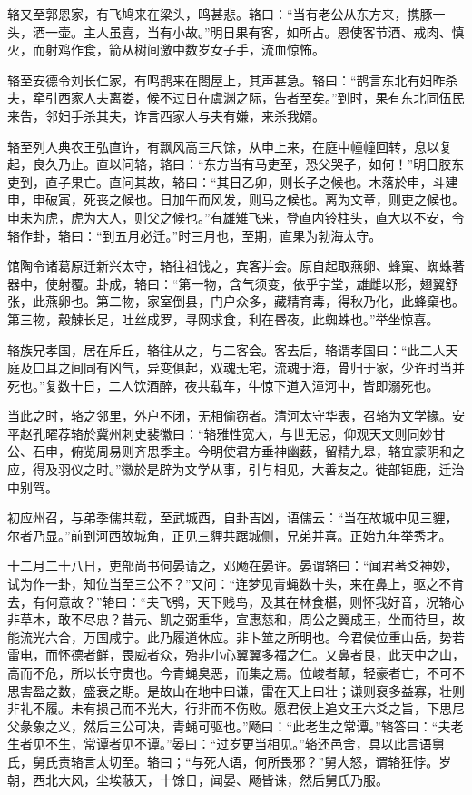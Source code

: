 \documentclass[12pt,UTF8]{ctexbook}
\begin{document}
辂又至郭恩家，有飞鸠来在梁头，鸣甚悲。辂曰：“当有老公从东方来，携豚一头，酒一壶。主人虽喜，当有小故。”明日果有客，如所占。恩使客节酒、戒肉、慎火，而射鸡作食，箭从树间激中数岁女子手，流血惊怖。

辂至安德令刘长仁家，有鸣鹊来在閤屋上，其声甚急。辂曰：“鹊言东北有妇昨杀夫，牵引西家人夫离娄，候不过日在虞渊之际，告者至矣。”到时，果有东北同伍民来告，邻妇手杀其夫，诈言西家人与夫有嫌，来杀我婿。

辂至列人典农王弘直许，有飘风高三尺馀，从申上来，在庭中幢幢回转，息以复起，良久乃止。直以问辂，辂曰：“东方当有马吏至，恐父哭子，如何！”明日胶东吏到，直子果亡。直问其故，辂曰：“其日乙卯，则长子之候也。木落於申，斗建申，申破寅，死丧之候也。日加午而风发，则马之候也。离为文章，则吏之候也。申未为虎，虎为大人，则父之候也。”有雄雉飞来，登直内铃柱头，直大以不安，令辂作卦，辂曰：“到五月必迁。”时三月也，至期，直果为勃海太守。

馆陶令诸葛原迁新兴太守，辂往祖饯之，宾客并会。原自起取燕卵、蜂窠、蜘蛛著器中，使射覆。卦成，辂曰：“第一物，含气须变，依乎宇堂，雄雌以形，翅翼舒张，此燕卵也。第二物，家室倒县，门户众多，藏精育毒，得秋乃化，此蜂窠也。第三物，觳觫长足，吐丝成罗，寻网求食，利在昬夜，此蜘蛛也。”举坐惊喜。

辂族兄孝国，居在斥丘，辂往从之，与二客会。客去后，辂谓孝国曰：“此二人天庭及口耳之间同有凶气，异变俱起，双魂无宅，流魂于海，骨归于家，少许时当并死也。”复数十日，二人饮酒醉，夜共载车，牛惊下道入漳河中，皆即溺死也。

当此之时，辂之邻里，外户不闭，无相偷窃者。清河太守华表，召辂为文学掾。安平赵孔曜荐辂於冀州刺史裴徽曰：“辂雅性宽大，与世无忌，仰观天文则同妙甘公、石申，俯览周易则齐思季主。今明使君方垂神幽薮，留精九皋，辂宜蒙阴和之应，得及羽仪之时。”徽於是辟为文学从事，引与相见，大善友之。徙部钜鹿，迁治中别驾。

初应州召，与弟季儒共载，至武城西，自卦吉凶，语儒云：“当在故城中见三貍，尔者乃显。”前到河西故城角，正见三貍共踞城侧，兄弟并喜。正始九年举秀才。

十二月二十八日，吏部尚书何晏请之，邓飏在晏许。晏谓辂曰：“闻君著爻神妙，试为作一卦，知位当至三公不？”又问：“连梦见青蝇数十头，来在鼻上，驱之不肯去，有何意故？”辂曰：“夫飞鸮，天下贱鸟，及其在林食椹，则怀我好音，况辂心非草木，敢不尽忠？昔元、凯之弼重华，宣惠慈和，周公之翼成王，坐而待旦，故能流光六合，万国咸宁。此乃履道休应。非卜筮之所明也。今君侯位重山岳，势若雷电，而怀德者鲜，畏威者众，殆非小心翼翼多福之仁。又鼻者艮，此天中之山，高而不危，所以长守贵也。今青蝇臭恶，而集之焉。位峻者颠，轻豪者亡，不可不思害盈之数，盛衰之期。是故山在地中曰谦，雷在天上曰壮；谦则裒多益寡，壮则非礼不履。未有损己而不光大，行非而不伤败。愿君侯上追文王六爻之旨，下思尼父彖象之义，然后三公可决，青蝇可驱也。”飏曰：“此老生之常谭。”辂答曰：“夫老生者见不生，常谭者见不谭。”晏曰：“过岁更当相见。”辂还邑舍，具以此言语舅氏，舅氏责辂言太切至。辂曰；“与死人语，何所畏邪？”舅大怒，谓辂狂悖。岁朝，西北大风，尘埃蔽天，十馀日，闻晏、飏皆诛，然后舅氏乃服。
\end{document}
